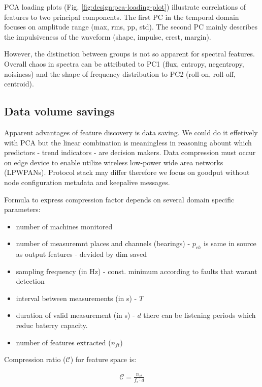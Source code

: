 PCA loading plots (Fig. \ref{fig:design:pca-loading-plot}) illustrate correlations of features to two principal components. The first PC in the temporal domain focuses on amplitude range (max, rms, pp, std). The second PC mainly describes the impulsiveness of the waveform (shape, impulse, crest, margin). 

However, the distinction between groups is not so apparent for spectral features. Overall chaos in spectra can be attributed to PC1 (flux, entropy, negentropy, noisiness) and the shape of frequency distribution to PC2 (roll-on, roll-off, centroid).


\subsection{Data volume savings}
Apparent advantages of feature discovery is data saving. We could do it effetively with PCA but the linear combination is meaningless in reasoning abount which predictors - trend indicators - are decision makers. Data compression must occur on edge device to enable utilize wireless low-power wide area networks (LPWPANs).
Protocol stack may differ therefore we focus on goodput without node configuration metadata and keepalive messages. 

Formula to express compression factor depends on several domain specific parameters:
\begin{itemize}
\itemsep0pt
\item number of machines monitored
\item number of measuremnt places and channels (bearings) - $p_{ch}$ is same in source as output features - devided by dim saved
\item sampling frequency (in Hz) - const. minimum according to faults that warant detection
\item interval between measurements (in s) - $T$
\item duration of valid measurement (in s) - $d$ there can be listening periods which reduc baterry capacity.
\item number of features extracted ($n_{ft}$)
\end{itemize}

Compression ratio ($\mathcal{C}$) for feature space is:
\begin{ceqn}\begin{align}
\mathcal{C} = \frac{n_{ft}}{f_s \cdot d}
\end{align}\end{ceqn}

